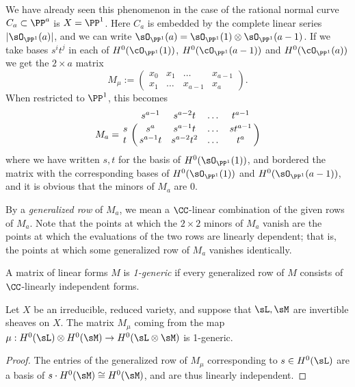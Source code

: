 \begin{example}
 We have already seen this phenomenon in the case of the rational normal curve $C_a\subset \PP^a$ is $X = \PP^1$.
Here $C_{a}$ is embedded by the complete
linear series $|\sO_{\PP^1}(a)|$, and  we can write $\sO_{\PP^1}(a) = \sO_{\PP^1}(1)\otimes \sO_{\PP^1}(a-1)$.
If we take bases $s^it^j$ in each of $H^0(\cO_{\PP^1}(1))$,  $H^0(\cO_{\PP^1}(a-1))$ and $H^0(\cO_{\PP^1}(a))$ 
we get
the $2\times a$ matrix
$$
M_\mu := 
\begin{pmatrix}
x_0&x_1&\dots&x_{a-1}\\
x_1&\dots&x_{a-1}&x_a
\end{pmatrix}.
$$
When restricted to $\PP^1$, this becomes
$$
M_a = \bordermatrix{
& s^{a-1}&s^{a-2}t&\dots&t^{a-1}\cr
s&  s^{a}& s^{a-1}t&\dots&st^{a-1}\cr
t&  s^{a-1}t& s^{a-2}t^{2}&\dots&t^{a}\cr
}$$
where we have written $s,t$ for the basis of $H^0(\sO_{\PP^1}(1))$, and bordered the matrix
with the corresponding bases of $H^0(\sO_{\PP^1}(1))$ and $H^0(\sO_{\PP^1}(a-1))$, and it is obvious
that the minors of $M_a$ are 0.
\end{example}

By a \emph{generalized row} of $M_{a}$, we mean a $\CC$-linear combination of the given rows of $M_{a}$. Note that the points at which the $2\times 2$ minors of $M_{a}$ vanish are the points at which the evaluations of the two rows are linearly dependent; that is, the points at which some
generalized row of $M_{a}$ vanishes identically. 

\begin{definition}
 A matrix of linear forms $M$ is  \emph{1-generic} if every generalized row of $M$
 consists of $\CC$-linearly independent forms.
 \end{definition}
 
 \begin{proposition}\label{some generators}
Let $X$ be
an irreducible, reduced variety, and suppose that $\sL,\sM$ are invertible sheaves on $X$.
The matrix $M_\mu$ coming from the map $\mu:H^0(\sL) \otimes H^0(\sM) \to H^0(\sL\otimes \sM)$
is 1-generic.
\end{proposition}

\begin{proof} The entries of the generalized row of $M_\mu$ corresponding to $s\in H^0(\sL)$
are a basis of $s\cdot H^0(\sM) \cong H^0(\sM)$, and are thus
linearly independent.
\end{proof}

